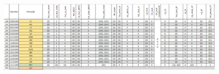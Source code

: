 \documentclass[12pt]{article}
\begin{document}
\begin{figure}[!htbp]
\centering
\includegraphics[width=1\textwidth]{Figuras/mde3.png}
\end{figure}
\end{document}

